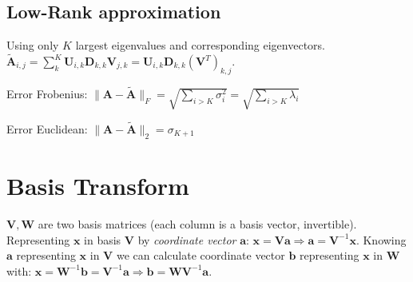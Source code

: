 \documentclass[a4paper, 11pt, landscape]{article}
\begin{document}
\begin{multicols*}{3}
\subsection{Low-Rank approximation}
Using only $K$ largest eigenvalues and corresponding eigenvectors. $\tilde{\mathbf{A}}_{i, j} = \sum_{k}^K \mathbf{U}_{i, k} \mathbf{D}_{k,k} \mathbf{V}_{j, k} = \mathbf{U}_{i, k} \mathbf{D}_{k,k} (\mathbf{V}^T)_{k, j}$.
\begin{compactdesc}
	\item[Error Frobenius:] $\|\mathbf{A} - \tilde{\mathbf{A}}\|_F = \sqrt{\sum_{i > K} \sigma_i^2} = \sqrt{\sum_{i > K} \lambda_i}$
	\item[Error Euclidean:] $\|\mathbf{A} - \tilde{\mathbf{A}}\|_2 = \sigma_{K+1}$
\end{compactdesc}

\section{Basis Transform}
$\mathbf{V}, \mathbf{W}$ are two basis matrices (each column is a basis vector, invertible). Representing $\mathbf{x}$ in basis $\mathbf{V}$ by \emph{coordinate vector} $\mathbf{a}$: $\mathbf{x} = \mathbf{V} \mathbf{a} \Rightarrow \mathbf{a} = \mathbf{V}^{-1} \mathbf{x}$. Knowing $\mathbf{a}$ representing $\mathbf{x}$ in $\mathbf{V}$ we can calculate coordinate vector $\mathbf{b}$ representing $\mathbf{x}$ in $\mathbf{W}$ with: $\mathbf{x} = \mathbf{W}^{-1} \mathbf{b} = \mathbf{V}^{-1} \mathbf{a} \Rightarrow \mathbf{b} = \mathbf{W} \mathbf{V}^{-1} \mathbf{a}$.


\end{multicols*}
\end{document}
